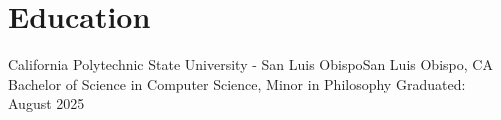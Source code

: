 \section{Education}
  \resumeSubHeadingListStart
    \resumeSubheading
      {California Polytechnic State University - San Luis Obispo}{San Luis Obispo, CA}
      {Bachelor of Science in Computer Science, Minor in Philosophy} {Graduated: August 2025}
      \resumeItemListStart
      \resumeItemListEnd
  \resumeSubHeadingListEnd
